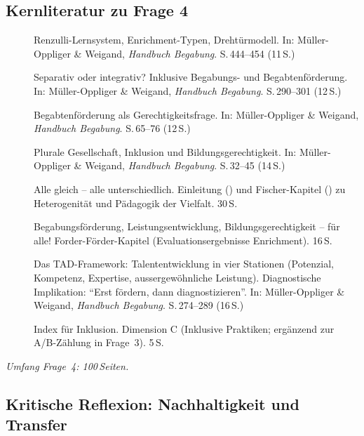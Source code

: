 \documentclass[ngerman, a4paper]{article}
\begin{document}
\subsection{Kernliteratur zu Frage 4}
 
\begin{description}
  \item[\cite{renzullireis2021rls}] Renzulli-Lernsystem, Enrichment-Typen,
    Drehtürmodell. In: Müller-Oppliger \& Weigand, \textit{Handbuch Begabung}.
    S.\,444--454 (11\,S.)
  \item[\cite{weigand2021separativ}] Separativ oder integrativ? Inklusive
    Begabungs- und Begabtenförderung.
    In: Müller-Oppliger \& Weigand, \textit{Handbuch Begabung}.
    S.\,290--301 (12\,S.)
  \item[\cite{sedmak2021bildungsgerechtigkeit}] Begabtenförderung als
    Gerechtigkeitsfrage. In: Müller-Oppliger \& Weigand,
    \textit{Handbuch Begabung}. S.\,65--76 (12\,S.)
  \item[\cite{muelleroppliger2021plurale}] Plurale Gesellschaft, Inklusion
    und Bildungsgerechtigkeit. In: Müller-Oppliger \& Weigand,
    \textit{Handbuch Begabung}. S.\,32--45 (14\,S.)
  \item[\cite{buholzer2010allegleich}] Alle gleich -- alle unterschiedlich.
    Einleitung (\cite{buholzerkummerwyss2010einfuehrung}) und Fischer-Kapitel
    (\cite{fischer2010begabung}) zu Heterogenität und Pädagogik der Vielfalt.
    30\,S.
  \item[\cite{fischer2020begabungsfoerderung}] Begabungsförderung,
    Leistungsentwicklung, Bildungsgerechtigkeit -- für alle!
    Forder-Förder-Kapitel (Evaluationsergebnisse Enrichment). 16\,S.
  \item[\cite{preckel2021tad}] Das TAD-Framework: Talententwicklung in vier
    Stationen (Potenzial, Kompetenz, Expertise, aussergewöhnliche Leistung).
    Diagnostische Implikation: \enquote{Erst fördern, dann diagnostizieren}.
    In: Müller-Oppliger \& Weigand, \textit{Handbuch Begabung}.
    S.\,274--289 (16\,S.)
  \item[\cite{booth2019index}] Index für Inklusion. Dimension C
    (Inklusive Praktiken; ergänzend zur A/B-Zählung in Frage~3). 5\,S.
\end{description}
 
\textit{Umfang Frage~4: 100\,Seiten.}
 

 


\subsection{Kritische Reflexion: Nachhaltigkeit und Transfer}
\end{document}
